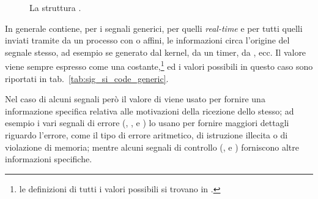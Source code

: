 \begin{figure}[!htb]
  \footnotesize \centering
  \begin{minipage}[c]{0.9\textwidth}
  \end{minipage} 
  \normalsize 
  \caption{La struttura .} 
  \label{fig:sig_siginfo_t}
\end{figure}
 
In generale  contiene, per i segnali generici, per quelli
\textit{real-time} e per tutti quelli inviati tramite da un processo con
 o affini, le informazioni circa l'origine del segnale stesso, ad
esempio se generato dal kernel, da un timer, da , ecc. Il valore
viene sempre espresso come una costante,\footnote{le definizioni di tutti i
  valori possibili si trovano in .} ed i valori possibili
in questo caso sono riportati in tab.~\ref{tab:sig_si_code_generic}.

Nel caso di alcuni segnali però il valore di  viene usato per
fornire una informazione specifica relativa alle motivazioni della ricezione
dello stesso; ad esempio i vari segnali di errore (,
,  e ) lo usano per fornire
maggiori dettagli riguardo l'errore, come il tipo di errore aritmetico, di
istruzione illecita o di violazione di memoria; mentre alcuni segnali di
controllo (,  e ) forniscono
altre informazioni specifiche.

